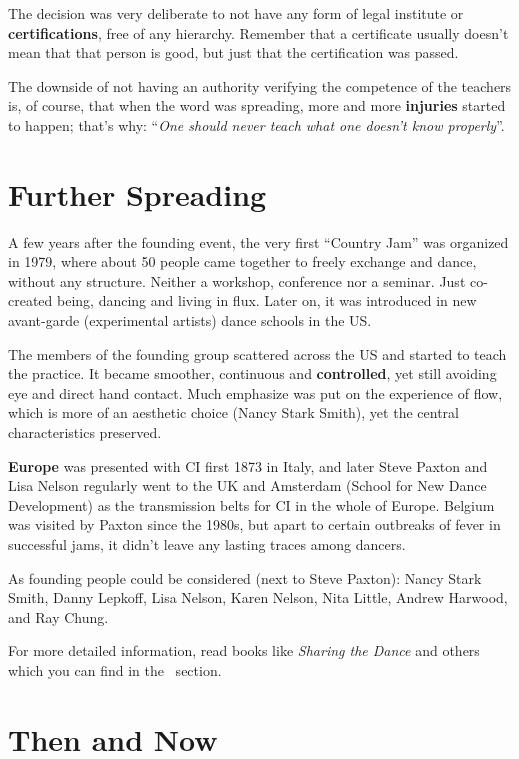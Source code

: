 The decision was very deliberate to not have any form of legal institute or \textbf{certifications}, free of any hierarchy.
Remember that a certificate usually doesn't mean that that person is good, but just that the certification was passed.

The downside of not having an authority verifying the competence of the teachers is, of course, that when the word was spreading, more and more \textbf{injuries} started to happen; that's why: ``\textit{One should never teach what one doesn't know properly}''.

\section{Further Spreading}\label{sec:further-spreading}

A few years after the founding event, the very first ``Country Jam'' was organized in 1979, where about 50 people came together to freely exchange and dance, without any structure.
Neither a workshop, conference nor a seminar.
Just co-created being, dancing and living in flux.
Later on, it was introduced in new avant-garde (experimental artists) dance schools in the US\@.

The members of the founding group scattered across the US and started to teach the practice.
It became smoother, continuous and \textbf{controlled}, yet still avoiding eye and direct hand contact.
Much emphasize was put on the experience of flow, which is more of an aesthetic choice (Nancy Stark Smith), yet the central characteristics preserved.

\textbf{Europe} was presented with CI first 1873 in Italy, and later Steve Paxton and Lisa Nelson regularly went to the UK and Amsterdam (School for New Dance Development) as the transmission belts for CI in the whole of Europe.
Belgium was visited by Paxton since the 1980s, but apart to certain outbreaks of fever in successful jams, it didn't leave any lasting traces among dancers.

As founding people could be considered (next to Steve Paxton): Nancy Stark Smith, Danny Lepkoff, Lisa Nelson, Karen Nelson, Nita Little, Andrew Harwood, and Ray Chung.

For more detailed information, read books like \textit{Sharing the Dance} and others which you can find in the~ section.

\section{Then and Now}\label{sec:then-and-now}

